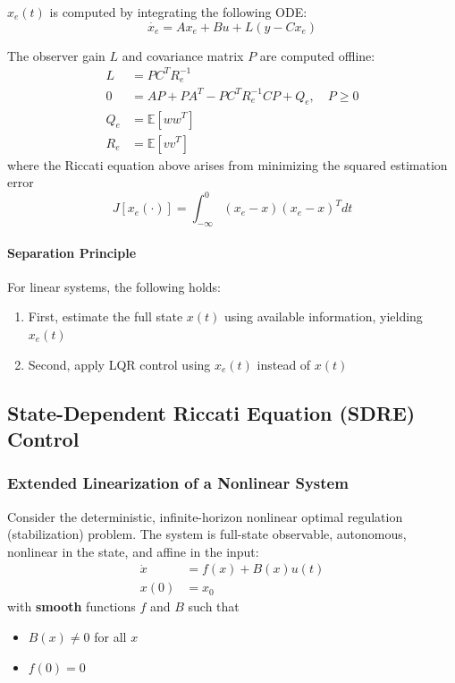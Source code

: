 \newpar{}

$x_e(t)$ is computed by integrating the following ODE:
\begin{equation*}
    \dot{x_e} = A x_e + B u + L(y - C x_e)
\end{equation*}

\newpar{}
The observer gain $L$ and covariance matrix $P$ are computed offline:
\begin{align*}
    L   & = P C^T R_e^{-1}                                         \\
    0   & = A P + P A^T - P C^T R_e^{-1} C P + Q_e, \quad P \geq 0 \\
    Q_e & = \mathbb{E}[w w^T]                                      \\
    R_e & = \mathbb{E}[v v^T]
\end{align*}
where the Riccati equation above arises from minimizing the squared estimation error
\begin{equation*}
    J[x_e(\cdot)] = \int_{-\infty}^0 \left( x_e - x \right) \left( x_e - x \right)^T dt
\end{equation*}

\paragraph{Separation Principle}

For linear systems, the following holds:
\begin{enumerate}
    \item First, estimate the full state $x(t)$ using available information, yielding $x_e(t)$
    \item Second, apply LQR control using $x_e(t)$ instead of $x(t)$
\end{enumerate}

\subsection{State-Dependent Riccati Equation (SDRE) Control}
\subsubsection{Extended Linearization of a Nonlinear System}

Consider the deterministic, infinite-horizon nonlinear optimal regulation (stabilization) problem. The system is full-state observable, autonomous, nonlinear in the state, and affine in the input:
\begin{align*}
    \dot{x} & = f(x) + B(x) u(t) \\
    x(0)    & = x_0
\end{align*}
with \textbf{smooth} functions $f$ and $B$ such that
\begin{itemize}
    \item $B(x) \neq 0$ for all $x$
    \item $f(0) = 0$
\end{itemize}


